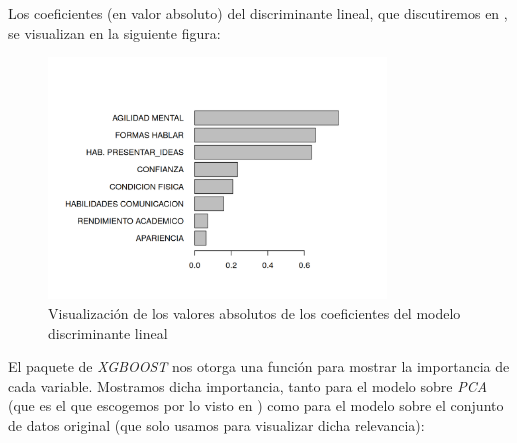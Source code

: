 \documentclass[11pt]{article}
\begin{document}
Los coeficientes (en valor absoluto) del discriminante lineal, que discutiremos en , se visualizan en la siguiente figura:

\begin{figure}[H]
    \centering
    \includegraphics[width=0.8\textwidth]{coeficientes_lda}
    \caption{Visualización de los valores absolutos de los coeficientes del modelo discriminante lineal}
\end{figure}

El paquete de \textit{XGBOOST} nos otorga una función para mostrar la importancia de cada variable. Mostramos dicha importancia, tanto para el modelo sobre \textit{PCA} (que es el que escogemos por lo visto en ) como para el modelo sobre el conjunto de datos original (que solo usamos para visualizar dicha relevancia):
\end{document}
